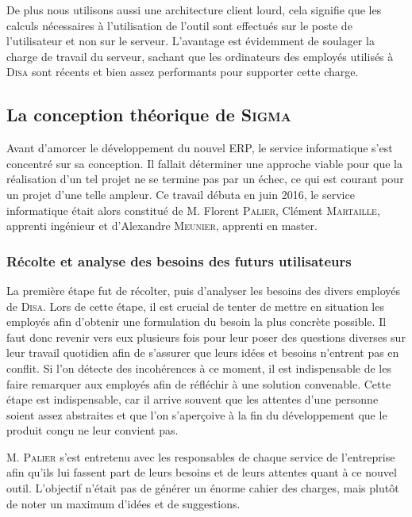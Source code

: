 De plus nous utilisons aussi une architecture client lourd, cela signifie que les calculs nécessaires à l'utilisation de l'outil sont effectués sur le poste de l'utilisateur et non sur le serveur.
L'avantage est évidemment de soulager la charge de travail du serveur, sachant que les ordinateurs des employés utilisés à \textsc{Disa} sont récents et bien assez performants pour supporter cette charge.

\subsection{La conception théorique de \textsc{Sigma}}

Avant d'amorcer le développement du nouvel ERP, le service informatique s'est concentré sur sa conception.
Il fallait déterminer une approche viable pour que la réalisation d'un tel projet ne se termine pas par un échec, ce qui est courant pour un projet d'une telle ampleur.
Ce travail débuta en juin 2016, le service informatique était alors constitué de M. Florent \textsc{Palier}, Clément \textsc{Martaille}, apprenti ingénieur et d'Alexandre \textsc{Meunier}, apprenti en master.

\subsubsection{Récolte et analyse des besoins des futurs utilisateurs}

La première étape fut de récolter, puis d'analyser les besoins des divers employés de \textsc{Disa}.
Lors de cette étape, il est crucial de tenter de mettre en situation les employés afin d'obtenir une formulation du besoin la plus concrète possible.
Il faut donc revenir vers eux plusieurs fois pour leur poser des questions diverses sur leur travail quotidien afin de s'assurer que leurs idées et besoins n'entrent pas en conflit.
Si l'on détecte des incohérences à ce moment, il est indispensable de les faire remarquer aux employés afin de réfléchir à une solution convenable.
Cette étape est indispensable, car il arrive souvent que les attentes d'une personne soient assez abstraites et que l'on s'aperçoive à la fin du développement que le produit conçu ne leur convient pas.

M. \textsc{Palier} s'est entretenu avec les responsables de chaque service de l'entreprise afin qu'ils lui fassent part de leurs besoins et de leurs attentes quant à ce nouvel outil.
L'objectif n'était pas de générer un énorme cahier des charges, mais plutôt de noter un maximum d'idées et de suggestions.

